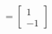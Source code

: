 \documentclass[preview]{standalone}
\begin{document}
\begin{align*}
= \begin{bmatrix} 1 \\ -1 \end{bmatrix}
\end{align*}
\end{document}

